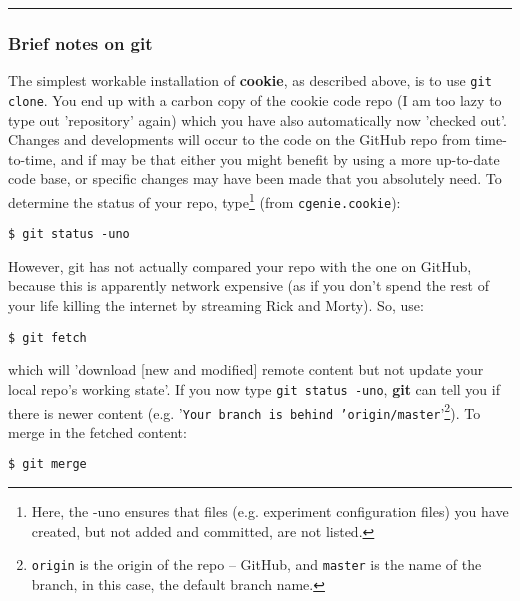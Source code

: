 \vspace{1mm}\noindent\rule{4cm}{0.5pt}\vspace{2mm}

\subsubsection*{Brief notes on git}

The simplest workable installation of \textbf{cookie}, as described above, is to use \texttt{git clone}. You end up with a carbon copy of the cookie code repo (I am too lazy to type out 'repository' again) which you have also automatically now 'checked out'. Changes and developments will occur to the code on the GitHub repo from time-to-time, and if may be that either you might benefit by using a more up-to-date code base, or specific changes may have been made that you absolutely need. To determine the status of your repo, type\footnote{Here, the -uno ensures that files (e.g. experiment configuration files) you have created, but not added and committed, are not listed.} (from \texttt{cgenie.cookie}):

\vspace{-2mm}
\begin{verbatim}
$ git status -uno
\end{verbatim}
\vspace{-2mm}

\noindent However, git has not actually compared your repo with the one on GitHub, because this is apparently network expensive (as if you don't spend the rest of your life killing the internet by streaming Rick and Morty). So, use:

\vspace{-2mm}
\begin{verbatim}
$ git fetch
\end{verbatim}
\vspace{-2mm}

\noindent which will 'download [new and modified] remote content but not update your local repo's working state'. If you now type \texttt{git status -uno}, \textbf{git} can tell you if there is newer content (e.g. '\texttt{Your branch is behind 'origin/master}'\footnote{\texttt{origin} is the origin of the repo -- GitHub, and \texttt{master} is the name of the branch, in this case, the default branch name.}). To merge in the fetched content:

\vspace{-2mm}
\begin{verbatim}
$ git merge
\end{verbatim}
\vspace{-2mm}

